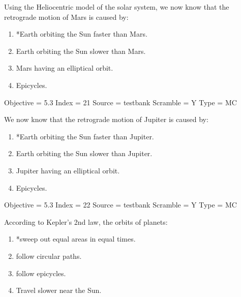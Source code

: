 \documentclass[11pt]{article}
\begin{document}
\begin{enumerate}
\begin{minipage}{\textwidth}
\begin{minipage}{\textwidth}
\item Using the Heliocentric model of the solar system, we now know that the retrograde motion of Mars is caused by:
\begin{enumerate} 
\setlength{\itemsep}{1pt} 
\setlength{\parskip}{0pt} 
\setlength{\parsep}{0pt}
\setlength{\multicolsep}{1pt} 
\item *Earth orbiting the Sun faster than Mars.
\item Earth orbiting the Sun slower than Mars.
\item Mars having an elliptical orbit.
\item Epicycles.
\end{enumerate} 
Objective = 5.3
Index = 21
Source = testbank
Scramble = Y
Type = MC
\end{minipage}
\end{minipage}
\vskip 0.20in

\begin{minipage}{\textwidth}
\begin{minipage}{\textwidth}
\item We now know that the retrograde motion of Jupiter is caused by:
\begin{enumerate} 
\setlength{\itemsep}{1pt} 
\setlength{\parskip}{0pt} 
\setlength{\parsep}{0pt}
\setlength{\multicolsep}{1pt} 
\item *Earth orbiting the Sun faster than Jupiter.
\item Earth orbiting the Sun slower than Jupiter.
\item Jupiter having an elliptical orbit.
\item Epicycles.
\end{enumerate} 
Objective = 5.3
Index = 22
Source = testbank
Scramble = Y
Type = MC
\end{minipage}
\end{minipage}
\vskip 0.20in

\begin{minipage}{\textwidth}
\begin{minipage}{\textwidth}
\item According to Kepler's 2nd law, the orbits of planets:
\begin{multicols}{2}
\begin{enumerate} 
\setlength{\itemsep}{1pt} 
\setlength{\parskip}{0pt} 
\setlength{\parsep}{0pt}
\setlength{\multicolsep}{1pt} 
\item *sweep out equal areas in equal times.
\item follow circular paths.
\item follow epicycles.
\item Travel slower near the Sun.
\end{enumerate} 
\vfill 
\end{multicols}


\end{minipage}
\end{minipage}
\end{enumerate}
\end{document}
